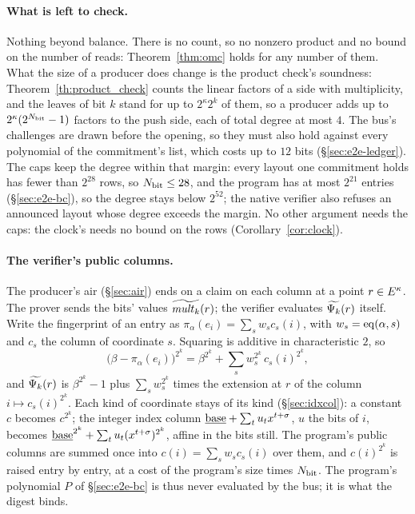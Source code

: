 \paragraph{What is left to check.} Nothing beyond balance. There is no count, so no nonzero product and no bound on the number of reads: Theorem~\ref{thm:omc} holds for any number of them. What the size of a producer does change is the product check's soundness: Theorem~\ref{th:product_check} counts the linear factors of a side with multiplicity, and the leaves of bit $k$ stand for up to $2^{\kappa}2^{k}$ of them, so a producer adds up to $2^{\kappa}(2^{N_{\mathrm{bit}}}-1)$ factors to the push side, each of total degree at most $4$. The bus's challenges are drawn before the opening, so they must also hold against every polynomial of the commitment's list, which costs up to $12$ bits (\S\ref{sec:e2e-ledger}). The caps keep the degree within that margin: every layout one commitment holds has fewer than $2^{28}$ rows, so $N_{\mathrm{bit}}\le28$, and the program has at most $2^{21}$ entries (\S\ref{sec:e2e-bc}), so the degree stays below $2^{52}$; the native verifier also refuses an announced layout whose degree exceeds the margin. No other argument needs the caps: the clock's needs no bound on the rows (Corollary~\ref{cor:clock}).

\paragraph{The verifier's public columns.} The producer's air (\S\ref{sec:air}) ends on a claim on each column at a point $r\in E^{\kappa}$. The prover sends the bits' values $\widetilde{\mathit{mult}_{k}}(r)$; the verifier evaluates $\widetilde{\Psi_{k}}(r)$ itself. Write the fingerprint of an entry as $\pi_\alpha(e_i)=\sum_sw_sc_s(i)$, with $w_s=\operatorname{eq}(\alpha,s)$ and $c_s$ the column of coordinate $s$. Squaring is additive in characteristic $2$, so
\[
  \bigl(\beta-\pi_\alpha(e_i)\bigr)^{2^{k}}=\beta^{2^{k}}+\sum_sw_s^{2^{k}}\,c_s(i)^{2^{k}},
\]
and $\widetilde{\Psi_{k}}(r)$ is $\beta^{2^{k}}-1$ plus $\sum_sw_s^{2^{k}}$ times the extension at $r$ of the column $i\mapsto c_s(i)^{2^{k}}$. Each kind of coordinate stays of its kind (\S\ref{sec:idxcol}): a constant $c$ becomes $c^{2^{k}}$; the integer index column $\underline{\mathrm{base}}+\sum_tu_tx^{t+\sigma}$, $u$ the bits of $i$, becomes $\underline{\mathrm{base}}^{2^{k}}+\sum_tu_t(x^{t+\sigma})^{2^{k}}$, affine in the bits still. The program's public columns are summed once into $c(i)=\sum_sw_sc_s(i)$ over them, and $c(i)^{2^{k}}$ is raised entry by entry, at a cost of the program's size times $N_{\mathrm{bit}}$. The program's polynomial $P$ of \S\ref{sec:e2e-bc} is thus never evaluated by the bus; it is what the digest binds.

